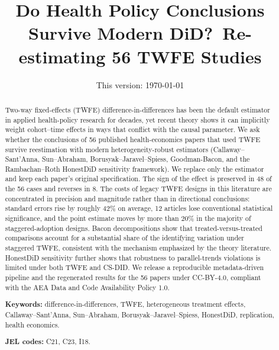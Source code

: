 \documentclass[11pt]{article}
\title{Do Health Policy Conclusions Survive Modern DiD?\
       Re-estimating 56 TWFE Studies}
\author{Victor Rangel\thanks{Insper, Master in Public Policy.
       Email: \texttt{victorrangelrodrigues@gmail.com}. This paper is based on
       the author's Master's dissertation (Insper, 2026), supervised by
       Cristine Pinto and Pedro H.~C. Sant'Anna.} \[0.2em]
       \emph{(co-author TBA)}}
\date{This version: \today}
\begin{document}
\maketitle

\begin{abstract}
\noindent Two-way fixed-effects (TWFE) difference-in-differences has been the
default estimator in applied health-policy research for decades, yet recent
theory shows it can implicitly weight cohort--time effects in ways that conflict
with the causal parameter. We ask whether the conclusions of 56 published
health-economics papers that used TWFE survive reestimation with modern
heterogeneity-robust estimators (Callaway--Sant'Anna, Sun--Abraham,
Borusyak--Jaravel--Spiess, Goodman-Bacon, and the Rambachan--Roth HonestDiD
sensitivity framework). We replace only the estimator and keep each paper's
original specification. The sign of the effect is preserved in 48 of the 56
cases and reverses in 8. The costs of legacy TWFE designs in
this literature are concentrated in precision and magnitude rather than in
directional conclusions: standard errors rise by roughly 42\% on average, 12
articles lose conventional statistical significance, and the point estimate
moves by more than 20\% in the majority of staggered-adoption designs. Bacon
decompositions show that treated-versus-treated comparisons account for a
substantial share of the identifying variation under staggered TWFE, consistent
with the mechanism emphasized by the theory literature. HonestDiD sensitivity
further shows that robustness to parallel-trends violations is limited under
both TWFE and CS-DID. We release a reproducible metadata-driven pipeline and
the regenerated results for the 56 papers under CC-BY-4.0, compliant with the
AEA Data and Code Availability Policy 1.0.

\medskip
\noindent\textbf{Keywords:} difference-in-differences, TWFE, heterogeneous
treatment effects, Callaway--Sant'Anna, Sun--Abraham, Borusyak--Jaravel--Spiess,
HonestDiD, replication, health economics.

\smallskip
\noindent\textbf{JEL codes:} C21, C23, I18.
\end{abstract}

\clearpage



\end{document}
